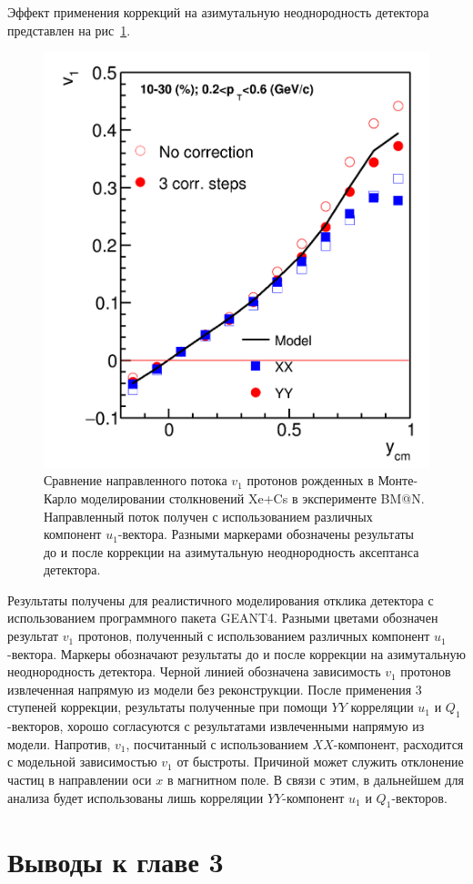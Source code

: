 Эффект применения коррекций на азимутальную неоднородность детектора представлен на рис~\ref{fig:bmn_components}.
%
\begin{figure}[ht]
\begin{center}
\includegraphics[width=0.45\linewidth]{images/v1_proton_correction_rapidity.png}
\caption{Сравнение направленного потока $v_1$ протонов рожденных в Монте-Карло моделировании столкновений Xe+Cs в эксперименте BM@N. Направленный поток получен с использованием различных компонент $u_1$-вектора. Разными маркерами обозначены результаты до и после коррекции на азимутальную неоднородность аксептанса детектора. }
\label{fig:bmn_components}
\end{center}
\end{figure}

Результаты получены для реалистичного моделирования отклика детектора с использованием программного пакета GEANT4.
Разными цветами обозначен результат $v_1$ протонов, полученный с использованием различных компонент $u_1$-вектора. 
Маркеры обозначают результаты до и после коррекции на азимутальную неоднородность детектора.
Черной линией обозначена зависимость $v_1$ протонов извлеченная напрямую из модели без реконструкции.
После применения 3 ступеней коррекции, результаты полученные при помощи $YY$ корреляции $u_1$ и $Q_1$-векторов, хорошо согласуются с результатами извлеченными напрямую из модели.
Напротив, $v_1$, посчитанный с использованием $XX$-компонент, расходится с модельной зависимостью $v_1$ от быстроты. 
Причиной может служить отклонение частиц в направлении оси $x$ в магнитном поле. 
В связи с этим, в дальнейшем для анализа будет использованы лишь корреляции $YY$-компонент $u_1$ и $Q_1$-векторов.


\section{Выводы к главе 3}

